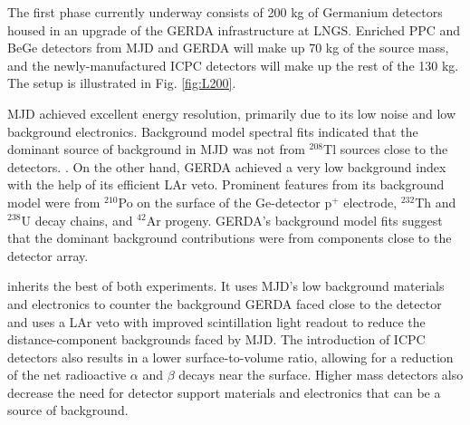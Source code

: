 The first phase currently underway consists of 200 kg of Germanium detectors housed in an upgrade of the GERDA infrastructure at LNGS. Enriched PPC and BeGe detectors from MJD and GERDA will make up 70 kg of the source mass, and the newly-manufactured ICPC detectors will make up the rest of the 130 kg. The setup is illustrated in Fig. \ref{fig:L200}. 

MJD achieved excellent energy resolution, primarily due to its low noise and low background electronics. Background model spectral fits indicated that the dominant source of background in MJD was not from $^{208}$Tl sources close to the detectors. \cite{Buuck_thesis}. On the other hand, GERDA achieved a very low background index with the help of its efficient LAr veto. Prominent features from its background model were from $^{210}$Po on the surface of the Ge-detector p$^+$ electrode, $^{232}$Th and $^{238}$U decay chains, and $^{42}$Ar progeny. GERDA's background model fits suggest that the dominant background contributions \cite{GERDA_final} were from components close to the detector array.

{\Ltwo} inherits the best of both experiments. It uses MJD's low background materials and electronics to counter the background GERDA faced close to the detector and uses a LAr veto with improved scintillation light readout to reduce the distance-component backgrounds faced by MJD. The introduction of ICPC detectors also results in a lower surface-to-volume ratio, allowing for a reduction of the net radioactive $\alpha$ and $\beta$ decays near the surface. Higher mass detectors also decrease the need for detector support materials and electronics that can be a source of background. 

